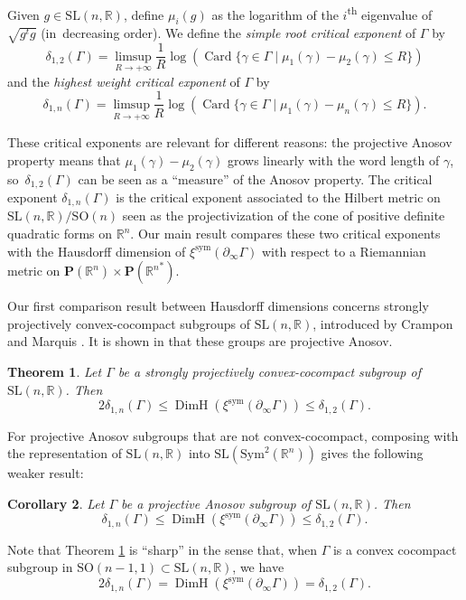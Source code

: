 \documentclass[JEP,XML,SOM,Unicode,NoEqCountersInSection,NoFloatCountersInSection,published]{cedram}
\newcommand{\sym}{\mathrm{sym}}
\newtheorem{theo}{Theorem}[section]
\newtheorem{coro}[theo]{Corollary}
\theoremstyle{definition}
\newcommand{\proj}{\mathbf{P}}
\newcommand{\R}{\mathbb{R}}
\newcommand{\SL}{\mathrm{SL}}
\newcommand{\SO}{\mathrm{SO}}
\DeclareMathOperator{\Card}{Card}
\DeclareMathOperator{\DimH}{DimH}
\let\G\Gamma
\begin{document}
Given $g\in \SL(n,\R)$, define $\mu_i(g)$ as the logarithm of the $i$\textsuperscript{th} eigenvalue of $\sqrt{g^t g}$ (in~decreasing order). We define the \emph{simple root critical exponent} of $\G$ by
\[\delta_{1,2}(\G) = \limsup_{R\to +\infty} \frac{1}{R} \log(\Card \{\gamma \in \G \mid \mu_1(\gamma) - \mu_2(\gamma) \leq R\})\]
and the \emph{highest weight critical exponent} of $\G$ by
\[\delta_{1,n}(\G) = \limsup_{R\to +\infty} \frac{1}{R} \log(\Card \{\gamma \in \G \mid \mu_1(\gamma) - \mu_n(\gamma) \leq R\}).
\]

These critical exponents are relevant for different reasons: the projective Anosov property means that $\mu_1(\gamma) - \mu_2(\gamma)$ grows linearly with the word length of $\gamma$, so~$\delta_{1,2}(\G)$ can be seen as a ``measure'' of the Anosov property. The critical exponent $\delta_{1,n}(\G)$ is the critical exponent associated to the Hilbert metric on $\SL(n,\R)/\SO(n)$ seen as the projectivization of the cone of positive definite quadratic forms on $\R^n$. Our main result compares these two critical exponents with the Hausdorff dimension of $\xi^{\sym}(\partial_\infty \G)$ with respect to a Riemannian metric on $\proj (\R^n) \times \proj({\R^n}^*)$.

Our first comparison result between Hausdorff dimensions concerns strongly projectively convex-cocompact subgroups of $\SL(n,\R)$, introduced by Crampon and Marquis \cite{crampon2014finitude}. It is shown in \cite{DGK} that these groups are projective Anosov.

\begin{theo} \label{theo-MainTheorem}
Let $\Gamma$ be a strongly projectively convex-cocompact subgroup of $\SL(n,\R)$. Then
\[2 \delta_{1,n}(\Gamma) \leq \DimH(\xi^{\sym}(\partial_\infty \G)) \leq \delta_{1,2}(\Gamma).\]
\end{theo}

For projective Anosov subgroups that are not convex-cocompact, composing with the representation of $\SL(n,\R)$ into $\SL(\mathrm{Sym}^2(\R^n))$ gives the following weaker result:
\begin{coro} \label{coro-NotConvexCocompact}
Let $\Gamma$ be a projective Anosov subgroup of $\SL(n,\R)$. Then
\[\delta_{1,n}(\Gamma) \leq \DimH(\xi^{\sym}(\partial_\infty \Gamma)) \leq \delta_{1,2}(\Gamma).\]
\end{coro}

Note that Theorem \ref{theo-MainTheorem} is ``sharp'' in the sense that, when $\Gamma$ is a convex cocompact subgroup in $\SO(n-1,1)\subset \SL(n,\R)$, we have
\[2\delta_{1,n}(\Gamma) = \DimH(\xi^{\sym}(\partial_\infty\Gamma)) = \delta_{1,2}(\Gamma).\]
\end{document}
